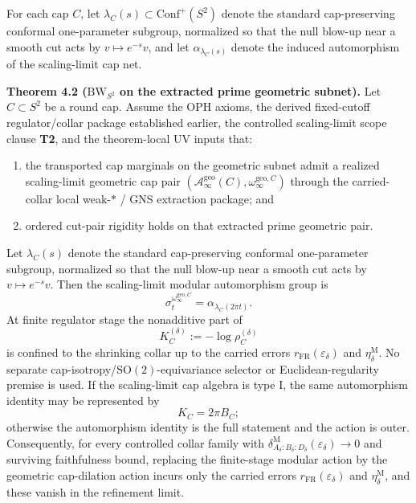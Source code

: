 For each cap \(C\), let \(\lambda_C(s)\subset \mathrm{Conf}^+(S^2)\) denote the standard cap-preserving conformal one-parameter subgroup, normalized so that the null blow-up near a smooth cut acts by \(v\mapsto e^{-s}v\), and let \(\alpha_{\lambda_C(s)}\) denote the induced automorphism of the scaling-limit cap net.

\textbf{Theorem 4.2 (\(\mathrm{BW}_{S^2}\) on the extracted prime geometric subnet).} Let \(C\subset S^2\) be a round cap. Assume the OPH axioms, the derived fixed-cutoff regulator/collar package established earlier, the controlled scaling-limit scope clause \textbf{T2}, and the theorem-local UV inputs that:
\begin{enumerate}
\item the transported cap marginals on the geometric subnet admit a realized scaling-limit geometric cap pair \((\mathcal A_\infty^{\mathrm{geo}}(C),\omega_\infty^{\mathrm{geo},C})\) through the carried-collar local weak-\(*\) / GNS extraction package; and
\item ordered cut-pair rigidity holds on that extracted prime geometric pair.
\end{enumerate}
Let \(\lambda_C(s)\) denote the standard cap-preserving conformal one-parameter subgroup, normalized so that the null blow-up near a smooth cut acts by \(v\mapsto e^{-s}v\). Then the scaling-limit modular automorphism group is
\[
\sigma_t^{\omega_\infty^{\mathrm{geo},C}}
=
\alpha_{\lambda_C(2\pi t)}.
\]
At finite regulator stage the nonadditive part of
\[
K_C^{(\delta)}:=-\log \rho_C^{(\delta)}
\]
is confined to the shrinking collar up to the carried errors \(r_{\mathrm{FR}}(\varepsilon_\delta)\) and \(\eta_\delta^{\mathrm M}\). No separate cap-isotropy/\(\mathrm{SO}(2)\)-equivariance selector or Euclidean-regularity premise is used. If the scaling-limit cap algebra is type I, the same automorphism identity may be represented by
\[
K_C=2\pi B_C;
\]
otherwise the automorphism identity is the full statement and the action is outer. Consequently, for every controlled collar family with \(\delta^{\mathrm M}_{A_\delta:B_\delta:D_\delta}(\varepsilon_\delta)\to0\) and surviving faithfulness bound, replacing the finite-stage modular action by the geometric cap-dilation action incurs only the carried errors \(r_{\mathrm{FR}}(\varepsilon_\delta)\) and \(\eta_\delta^{\mathrm M}\), and these vanish in the refinement limit.

